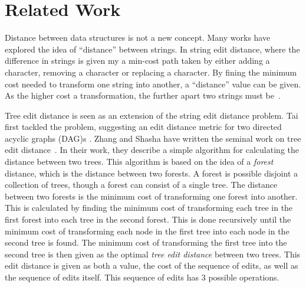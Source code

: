 



\section{Related Work}
\label{sec:related-work}

Distance between data structures is not a new concept. Many works have explored the idea of ``distance'' between strings. In string edit distance, where the difference in strings is given my a min-cost path taken by either adding a character, removing a character or replacing a character. By fining the minimum cost needed to transform one string into another, a ``distance'' value can be given. As the higher cost a transformation, the further apart two strings must be~\cite{yujianNormalizedLevenshteinDistance2007, masekFasterAlgorithmComputing1980}.

Tree edit distance is seen as an extension of the string edit distance problem. Tai first tackled the problem, suggesting an edit distance metric for two directed acyclic graphs (DAG)s \cite{tai_tree--tree_1979}. Zhang and Shasha have written the seminal work on tree edit distance~\cite{zhang_simple_1989}. In their work, they describe a simple algorithm for calculating the distance between two trees. This algorithm is based on the idea of a \textit{forest} distance, which is the distance between two forests. A forest is possible disjoint a collection of trees, though a forest can consist of a single tree. The distance between two forests is the minimum cost of transforming one forest into another. This is calculated by finding the minimum cost of transforming each tree in the first forest into each tree in the second forest. This is done recursively until the minimum cost of transforming each node in the first tree into each node in the second tree is found. The minimum cost of transforming the first tree into the second tree is then given as the optimal \emph{tree edit distance} between two trees. This edit distance is given as both a value, the cost of the sequence of edits, as well as the sequence of edits itself. This sequence of edits has 3 possible operations.


